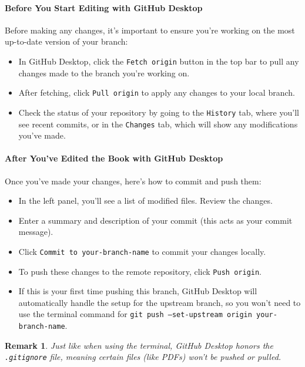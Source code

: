 \documentclass{article}
\newtheorem{remark}{Remark}
\begin{document}
\paragraph{Before You Start Editing with GitHub Desktop}

Before making any changes, it’s important to ensure you’re working on the most up-to-date version of your branch:

\begin{itemize}
    \item In GitHub Desktop, click the \texttt{Fetch origin} button in the top bar to pull any changes made to the branch you're working on.
    \item After fetching, click \texttt{Pull origin} to apply any changes to your local branch.
    \item Check the status of your repository by going to the \texttt{History} tab, where you'll see recent commits, or in the \texttt{Changes} tab, which will show any modifications you've made.
\end{itemize}

\paragraph{After You've Edited the Book with GitHub Desktop}

Once you’ve made your changes, here’s how to commit and push them:

\begin{itemize}
    \item In the left panel, you’ll see a list of modified files. Review the changes.
    \item Enter a summary and description of your commit (this acts as your commit message).
    \item Click \texttt{Commit to your-branch-name} to commit your changes locally.
    \item To push these changes to the remote repository, click \texttt{Push origin}.
    \item If this is your first time pushing this branch, GitHub Desktop will automatically handle the setup for the upstream branch, so you won’t need to use the terminal command for \texttt{git push --set-upstream origin your-branch-name}.
\end{itemize}

\begin{remark}
    Just like when using the terminal, GitHub Desktop honors the \texttt{.gitignore} file, meaning certain files (like PDFs) won’t be pushed or pulled.
\end{remark}
\end{document}
